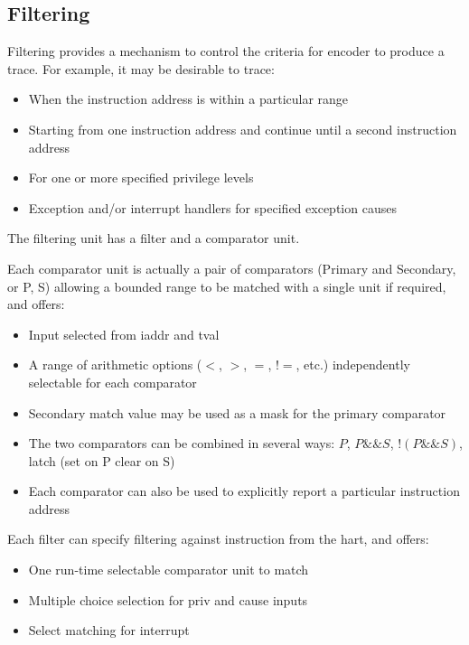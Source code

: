 \documentclass[main\_\_EN.tex]{subfiles}
\begin{document}
\subsection{Filtering}\label{sec:riscvtracenc-filter}

Filtering provides a mechanism to control the criteria for encoder to produce a trace. For example, it may be desirable to trace:
\begin{itemize}
    \item When the instruction address is within a particular range
    \item Starting from one instruction address and continue until a second instruction address
    \item For one or more specified privilege levels
    \item Exception and/or interrupt handlers for specified exception causes
\end{itemize}

The filtering unit has a filter and a comparator unit.

Each comparator unit is actually a pair of comparators (Primary and Secondary, or P, S) allowing a bounded range to be matched with a single unit if required, and offers:

\begin{itemize}
    \item Input selected from iaddr and tval
    \item A range of arithmetic options ($<$, $>$, $=$, $!=$, etc.) independently selectable for each comparator
    \item Secondary match value may be used as a mask for the primary comparator
    \item The two comparators can be combined in several ways: $P$, $P\&\&S$, $!(P\&\&S)$, latch (set on P clear on S)
    \item Each comparator can also be used to explicitly report a particular instruction address
\end{itemize}

Each filter can specify filtering against instruction from the hart, and offers:
\begin{itemize}
    \item One run-time selectable comparator unit to match
    \item Multiple choice selection for priv and cause inputs
    \item Select matching for interrupt
\end{itemize}
\end{document}
